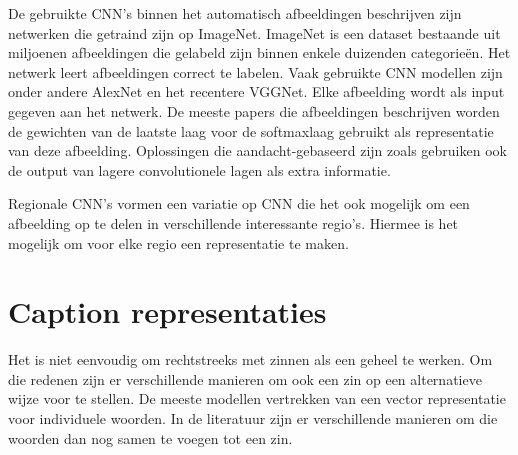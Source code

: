 De gebruikte CNN's binnen het automatisch afbeeldingen beschrijven zijn netwerken die getraind zijn op ImageNet.\cite{imagenet challenge} ImageNet is een dataset bestaande uit miljoenen afbeeldingen die gelabeld zijn binnen enkele duizenden categorie\"en. Het netwerk leert afbeeldingen correct te labelen. Vaak gebruikte CNN modellen zijn onder andere AlexNet \cite{Krizhevsky} en het recentere VGGNet\cite{Simonyan}. Elke afbeelding wordt als input gegeven aan het netwerk. De meeste papers die afbeeldingen beschrijven worden de gewichten van de laatste laag voor de softmaxlaag gebruikt als representatie van deze afbeelding.  Oplossingen die aandacht-gebaseerd zijn zoals \cite{Xu2015} gebruiken ook de output van lagere convolutionele lagen als extra informatie.

Regionale CNN's vormen een variatie op CNN die het ook mogelijk om een afbeelding op te delen in verschillende interessante regio's. Hiermee is het mogelijk om voor elke regio een representatie te maken.\cite{Karpathy2015}\cite{Fang} 

\section{Caption representaties}
Het is niet eenvoudig om rechtstreeks met zinnen als een geheel te werken. Om die redenen zijn er verschillende manieren om ook een zin op een alternatieve wijze voor te stellen.
De meeste modellen vertrekken van een vector representatie voor individuele woorden. In de literatuur zijn er verschillende manieren om die woorden dan nog samen te voegen tot een zin.

